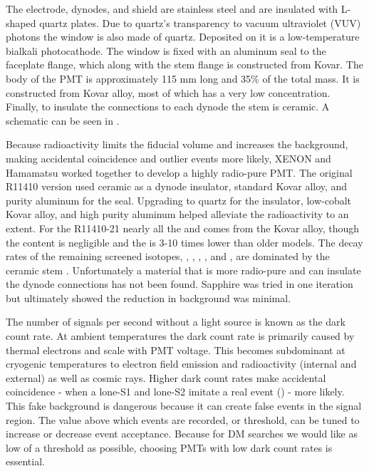 The electrode, dynodes, and shield are stainless steel and are insulated with L-shaped quartz plates.  Due to quartz's transparency to
vacuum ultraviolet (VUV) photons the window is also made of quartz.  Deposited on it is a low-temperature bialkali
photocathode.  The window is fixed with an aluminum seal to the faceplate flange, which along with the stem flange is constructed from
Kovar.  The body of the PMT is approximately 115 mm long and 35\% of the total mass.  It is constructed from Kovar alloy, most of which
has a very low  concentration.  Finally, to insulate the connections to each dynode the stem is ceramic.  A schematic can be
seen in .  

Because radioactivity limits the fiducial volume and increases the background, making accidental coincidence and outlier events more
likely, XENON and Hamamatsu worked together to develop a highly radio-pure PMT.  The original R11410 version used ceramic as a dynode
insulator, standard Kovar alloy, and purity aluminum for the seal.  Upgrading to quartz for the insulator, low-cobalt Kovar alloy, and
high purity aluminum helped alleviate
the radioactivity to an extent.  For the R11410-21 nearly all the  and  comes from the Kovar alloy, though the 
content is negligible and the  is 3-10 times lower than older models.  The decay rates of the remaining screened isotopes,
,
, , , and , are dominated by the ceramic stem .  Unfortunately a
material that is more radio-pure and can insulate the dynode connections has not been found.  Sapphire was tried in one iteration but
ultimately showed the reduction in background was minimal.

The number of signals per second without a light source is known as the dark count rate.  At ambient temperatures the dark count rate
is primarily caused by thermal electrons and scale with PMT voltage.  This becomes subdominant at
cryogenic temperatures to electron field emission and radioactivity (internal and external) as well as cosmic rays.  Higher dark count
rates make accidental coincidence - when a lone-S1 and lone-S2 imitate a real event () - more likely.  This
fake background is dangerous because it can create false events in the signal region.  The value above which events are recorded, or
threshold, can be tuned to increase or decrease event acceptance.  Because
for DM searches we would like as low of a threshold as possible, choosing PMTs with low dark count rates is essential.

